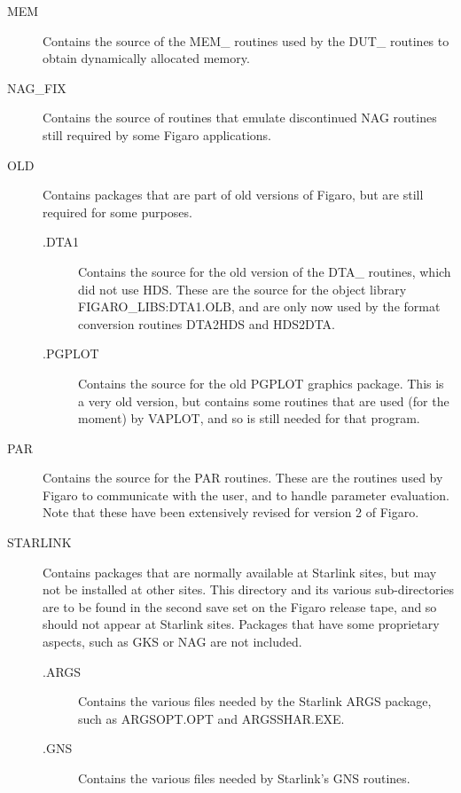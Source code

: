 \begin{description}
\item [MEM] Contains the source of the MEM\_ routines used by the DUT\_
routines to obtain dynamically allocated memory.

\item [NAG\_FIX] Contains the source of routines that emulate discontinued NAG
routines still required by some Figaro applications.

\item [OLD] Contains packages that are part of old versions of Figaro, but are
still required for some purposes.

\begin {description}

\item [.DTA1] Contains the source for the old version of the DTA\_ routines,
which did not use HDS. These are the source  for  the  object
library FIGARO\_LIBS:DTA1.OLB, and are only now used by the format conversion
routines DTA2HDS and HDS2DTA.

\item [.PGPLOT] Contains the source for the old PGPLOT graphics package.
This is a very old version, but contains some routines that are used (for
the moment) by VAPLOT, and so is still needed for that program.

\end{description}

\item [PAR] Contains the source for the PAR routines. These are the routines
used by Figaro to communicate with the user, and to handle parameter
evaluation. Note that these have been extensively revised for version 2 of
Figaro.

\item [STARLINK] Contains packages that are normally available at
Starlink sites, but may not be installed at other sites. This directory
and its various sub-directories are to be found in the second save set
on the Figaro release tape, and so should not appear at Starlink sites.
Packages that have some proprietary aspects, such as GKS or NAG are not
included.

\begin{description}

\item [.ARGS] Contains the various files needed by the Starlink ARGS
package, such as ARGS\-OPT\-.OPT and ARGSSHAR.EXE.

\item [.GNS] Contains the various files needed by Starlink's GNS
routines.


\end{description}
\end{description}
